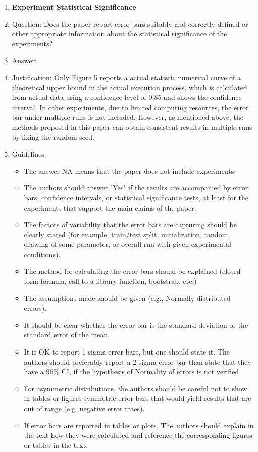 \documentclass{article}
\begin{document}
\begin{enumerate}
\item {\bf Experiment Statistical Significance}
    \item[] Question: Does the paper report error bars suitably and correctly defined or other appropriate information about the statistical significance of the experiments?
    \item[] Answer: \answerNo{} %
    \item[] Justification: Only Figure 5 reports a actual statistic numerical curve of a theoretical upper bound in the actual execution process, which is calculated from actual data using a confidence level of 0.85 and shows the confidence interval. In other experiments, due to limited computing resources, the error bar under multiple runs is not included. However, as mentioned above, the methods proposed in this paper can obtain consistent results in multiple runs by fixing the random seed.
    \item[] Guidelines:
    \begin{itemize}
        \item The answer NA means that the paper does not include experiments.
        \item The authors should answer "Yes" if the results are accompanied by error bars, confidence intervals, or statistical significance tests, at least for the experiments that support the main claims of the paper.
        \item The factors of variability that the error bars are capturing should be clearly stated (for example, train/test split, initialization, random drawing of some parameter, or overall run with given experimental conditions).
        \item The method for calculating the error bars should be explained (closed form formula, call to a library function, bootstrap, etc.)
        \item The assumptions made should be given (e.g., Normally distributed errors).
        \item It should be clear whether the error bar is the standard deviation or the standard error of the mean.
        \item It is OK to report 1-sigma error bars, but one should state it. The authors should preferably report a 2-sigma error bar than state that they have a 96\% CI, if the hypothesis of Normality of errors is not verified.
        \item For asymmetric distributions, the authors should be careful not to show in tables or figures symmetric error bars that would yield results that are out of range (e.g. negative error rates).
        \item If error bars are reported in tables or plots, The authors should explain in the text how they were calculated and reference the corresponding figures or tables in the text.
    \end{itemize}


\end{enumerate}
\end{document}
